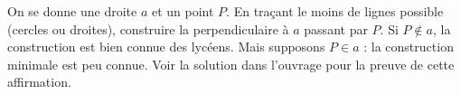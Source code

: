 On se donne une droite $a$ et un point $P$. En traçant le moins de lignes possible (cercles ou droites), construire la perpendiculaire à $a$ passant par $P$. Si $P \notin a$, la construction est bien connue des lycéens. Mais supposons $P \in a$ : la construction minimale est peu connue. Voir la solution dans l'ouvrage pour la preuve de cette affirmation.

